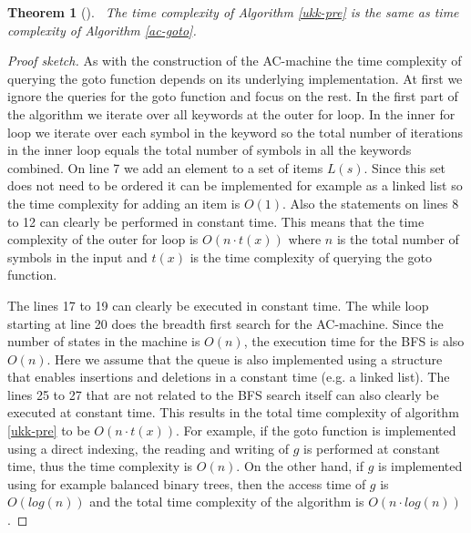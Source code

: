 \documentclass[english,twoside,censored,csm,algorithms-track-2020]{HYthesisML}
\theoremstyle{plain}
\newtheorem{theorem}{Theorem}[chapter]
\theoremstyle{definition}
\begin{document}
\begin{theorem}[]~\label{thm-time-pre}
  The time complexity of Algorithm \ref{ukk-pre} is the same as time complexity of
  Algorithm \ref{ac-goto}.
\end{theorem}
\begin{proof}[Proof sketch]
As with the construction of
the AC-machine the time complexity of querying the goto function depends on its underlying
implementation. At first we ignore the queries for the goto function and focus on the rest.
In the first part of the algorithm we iterate over all keywords at the outer for loop. In the
inner for loop we iterate over each symbol in the keyword so the total number of iterations
in the inner loop equals the total number of symbols in all the keywords combined. On line 7
we add an element to a set of items $L(s)$. Since this set does not need to be ordered it can be
implemented for example as a linked list so the time complexity for adding an item is $O(1)$.
Also the statements on lines 8 to 12 can clearly be performed in constant time. This means that
the time complexity of the outer for loop is $O(n\cdot t(x))$ where $n$ is the total number of
symbols in the input and $t(x)$ is the time complexity of querying the goto function.

The lines 17 to 19 can clearly be executed in constant time. The while loop starting at line 20
does the breadth first search for the AC-machine. Since the number of states in the machine is
$O(n)$, the execution time for the BFS is also $O(n)$. Here we assume that the queue is also
implemented using a structure that enables insertions and deletions in a constant time (e.g.
a linked list). The lines 25 to 27 that are not related to the BFS search itself can also clearly
be executed at constant time. This results in the total time complexity of algorithm \ref{ukk-pre} to be
$O(n\cdot t(x))$. For example, if the goto function is implemented using a direct indexing, the
reading and writing of $g$ is performed at constant time, thus the time complexity is $O(n)$.
On the other hand, if $g$ is implemented using for example balanced binary trees, then the access
time of $g$ is $O(log (n))$ and the total time complexity of the algorithm is $O(n\cdot log(n))$.
\end{proof}
\end{document}
